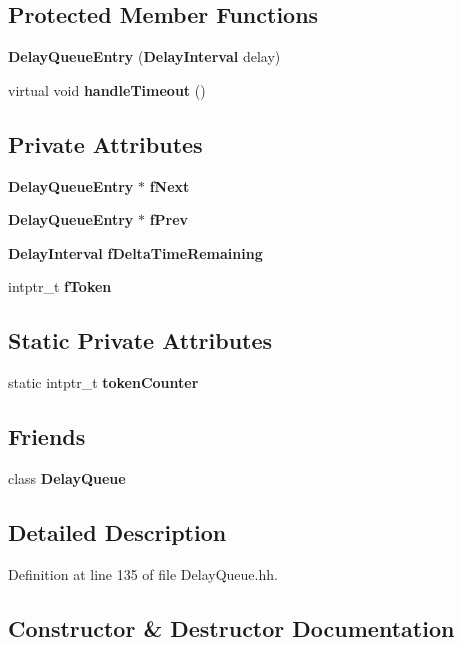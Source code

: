 \subsection*{Protected Member Functions}
\begin{DoxyCompactItemize}
\item 
{\bf Delay\+Queue\+Entry} ({\bf Delay\+Interval} delay)
\item 
virtual void {\bf handle\+Timeout} ()
\end{DoxyCompactItemize}
\subsection*{Private Attributes}
\begin{DoxyCompactItemize}
\item 
{\bf Delay\+Queue\+Entry} $\ast$ {\bf f\+Next}
\item 
{\bf Delay\+Queue\+Entry} $\ast$ {\bf f\+Prev}
\item 
{\bf Delay\+Interval} {\bf f\+Delta\+Time\+Remaining}
\item 
intptr\+\_\+t {\bf f\+Token}
\end{DoxyCompactItemize}
\subsection*{Static Private Attributes}
\begin{DoxyCompactItemize}
\item 
static intptr\+\_\+t {\bf token\+Counter}
\end{DoxyCompactItemize}
\subsection*{Friends}
\begin{DoxyCompactItemize}
\item 
class {\bf Delay\+Queue}
\end{DoxyCompactItemize}


\subsection{Detailed Description}


Definition at line 135 of file Delay\+Queue.\+hh.



\subsection{Constructor \& Destructor Documentation}
